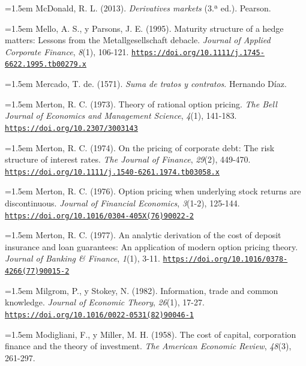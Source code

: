 \documentclass[10pt,a4paper]{article}
\begin{document}
\noindent\hangindent=1.5em McDonald, R. L. (2013). \textit{Derivatives markets} (3.ª ed.). Pearson.

\noindent\hangindent=1.5em Mello, A. S., y Parsons, J. E. (1995). Maturity structure of a hedge matters: Lessons from the Metallgesellschaft debacle. \textit{Journal of Applied Corporate Finance}, \textit{8}(1), 106-121. \href{https://doi.org/10.1111/j.1745-6622.1995.tb00279.x}{\nolinkurl{https://doi.org/10.1111/j.1745-6622.1995.tb00279.x}}

\noindent\hangindent=1.5em Mercado, T. de. (1571). \textit{Suma de tratos y contratos}. Hernando Díaz.

\noindent\hangindent=1.5em Merton, R. C. (1973). Theory of rational option pricing. \textit{The Bell Journal of Economics and Management Science}, \textit{4}(1), 141-183. \href{https://doi.org/10.2307/3003143}{\nolinkurl{https://doi.org/10.2307/3003143}}

\noindent\hangindent=1.5em Merton, R. C. (1974). On the pricing of corporate debt: The risk structure of interest rates. \textit{The Journal of Finance}, \textit{29}(2), 449-470. \href{https://doi.org/10.1111/j.1540-6261.1974.tb03058.x}{\nolinkurl{https://doi.org/10.1111/j.1540-6261.1974.tb03058.x}}

\noindent\hangindent=1.5em Merton, R. C. (1976). Option pricing when underlying stock returns are discontinuous. \textit{Journal of Financial Economics}, \textit{3}(1-2), 125-144. \href{https://doi.org/10.1016/0304-405X(76)90022-2}{\nolinkurl{https://doi.org/10.1016/0304-405X(76)90022-2}}

{\sloppy\noindent\hangindent=1.5em Merton, R. C. (1977). An analytic derivation of the cost of deposit insurance and loan guarantees: An application of modern option pricing theory. \textit{Journal of Banking \& Finance}, \textit{1}(1), 3-11. \href{https://doi.org/10.1016/0378-4266(77)90015-2}{\nolinkurl{https://doi.org/10.1016/0378-4266(77)90015-2}}\par}

\noindent\hangindent=1.5em Milgrom, P., y Stokey, N. (1982). Information, trade and common knowledge. \textit{Journal of Economic Theory}, \textit{26}(1), 17-27. \href{https://doi.org/10.1016/0022-0531(82)90046-1}{\nolinkurl{https://doi.org/10.1016/0022-0531(82)90046-1}}

\noindent\hangindent=1.5em Modigliani, F., y Miller, M. H. (1958). The cost of capital, corporation finance and the theory of investment. \textit{The American Economic Review}, \textit{48}(3), 261-297.
\end{document}
